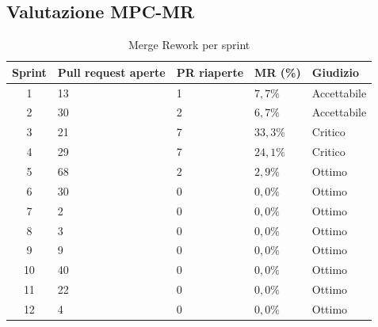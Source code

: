 \documentclass[a4paper, 10pt, colorlinks=true, linkcolor=black, urlcolor=blue, citecolor=blue, hidelinks]{article}
\begin{document}
\subsection{Valutazione MPC-MR}
\begin{table}[H]
    \centering
	\begin{tabular}{|c|l|l|l|p{3cm}|}
		\hline
		\textbf{Sprint} & \textbf{Pull request aperte} & \textbf{PR riaperte} & \textbf{MR (\%)} & \textbf{Giudizio} \\
		\hline
		1 & 13 & 1 & $7,7\%$ & Accettabile\\ 
		\hline
        2 & 30 & 2 & $6,7\%$ & Accettabile \\
        \hline
        3 & 21 & 7 & $33,3\%$ & Critico \\
        \hline
        4 & 29 & 7 & $24,1\%$ & Critico \\
        \hline
        5 & 68 & 2 & $2,9\%$ & Ottimo  \\
        \hline
        6 & 30 & 0 & $0,0\%$ & Ottimo \\
        \hline
        7 & 2 & 0 & $0,0\%$ & Ottimo \\
        \hline
        8 & 3 & 0 & $0,0\%$ & Ottimo \\
        \hline
        9 & 9 & 0 & $0,0\%$ & Ottimo \\
        \hline
        10 & 40 & 0 & $0,0\%$ & Ottimo \\
        \hline
        11 & 22 & 0 & $0,0\%$ & Ottimo \\
        \hline
        12 & 4 & 0 & $0,0\%$ & Ottimo \\
        \hline
	\end{tabular}
	\caption{Merge Rework per sprint}
	\label{tab:mr}
\end{table}
\end{document}
